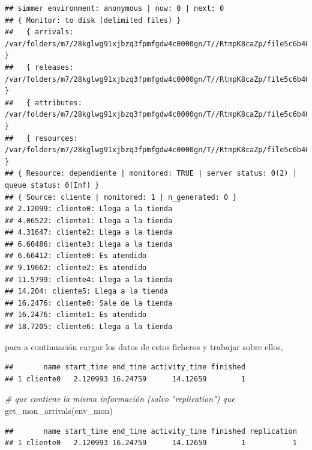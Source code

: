 \documentclass[
]{book}
\newenvironment{Shaded}{\begin{snugshade}}{\end{snugshade}}
\newcommand{\CommentTok}[1]{\textcolor[rgb]{0.56,0.35,0.01}{\textit{#1}}}
\newcommand{\FunctionTok}[1]{\textcolor[rgb]{0.00,0.00,0.00}{#1}}
\newcommand{\NormalTok}[1]{#1}
\newcommand{\OtherTok}[1]{\textcolor[rgb]{0.56,0.35,0.01}{#1}}
\newcommand{\SpecialCharTok}[1]{\textcolor[rgb]{0.00,0.00,0.00}{#1}}
\theoremstyle{definition}
\theoremstyle{definition}
\theoremstyle{definition}
\theoremstyle{definition}
\theoremstyle{remark}
\begin{document}
\begin{verbatim}
## simmer environment: anonymous | now: 0 | next: 0
## { Monitor: to disk (delimited files) }
##   { arrivals: /var/folders/m7/28kglwg91xjbzq3fpmfgdw4c0000gn/T//RtmpK8caZp/file5c6b40a1517c_arrivals.csv }
##   { releases: /var/folders/m7/28kglwg91xjbzq3fpmfgdw4c0000gn/T//RtmpK8caZp/file5c6b40a1517c_releases.csv }
##   { attributes: /var/folders/m7/28kglwg91xjbzq3fpmfgdw4c0000gn/T//RtmpK8caZp/file5c6b40a1517c_attributes.csv }
##   { resources: /var/folders/m7/28kglwg91xjbzq3fpmfgdw4c0000gn/T//RtmpK8caZp/file5c6b40a1517c_resources.csv }
## { Resource: dependiente | monitored: TRUE | server status: 0(2) | queue status: 0(Inf) }
## { Source: cliente | monitored: 1 | n_generated: 0 }
## 2.12099: cliente0: Llega a la tienda
## 4.06522: cliente1: Llega a la tienda
## 4.31647: cliente2: Llega a la tienda
## 6.60486: cliente3: Llega a la tienda
## 6.66412: cliente0: Es atendido
## 9.19662: cliente2: Es atendido
## 11.5799: cliente4: Llega a la tienda
## 14.204: cliente5: Llega a la tienda
## 16.2476: cliente0: Sale de la tienda
## 16.2476: cliente1: Es atendido
## 18.7205: cliente6: Llega a la tienda
\end{verbatim}

para a continuación cargar los datos de estos ficheros y trabajar sobre ellos,

\begin{Shaded}
\end{Shaded}

\begin{verbatim}
##       name start_time end_time activity_time finished
## 1 cliente0   2.120993 16.24759      14.12659        1
\end{verbatim}

\begin{Shaded}
\begin{Highlighting}[]
\CommentTok{\# que contiene la misma información (salvo "replication") que}
\FunctionTok{get\_mon\_arrivals}\NormalTok{(env\_mon)}
\end{Highlighting}
\end{Shaded}

\begin{verbatim}
##       name start_time end_time activity_time finished replication
## 1 cliente0   2.120993 16.24759      14.12659        1           1
\end{verbatim}
\end{document}
